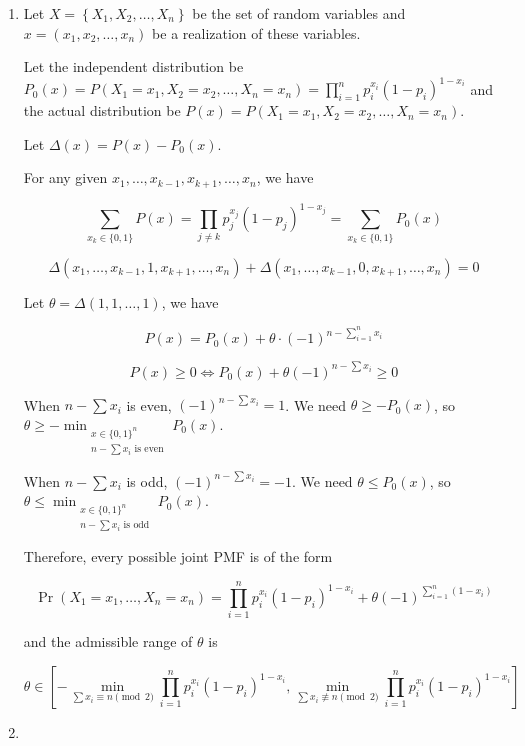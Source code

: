 \documentclass[a4paper]{article}
\begin{document}
\begin{enumerate}
    \item[(a)]
    
    Let $X = \left\{X_1, X_2, \dots, X_n\right\}$ be the set of random variables and $x = \left(x_1, x_2, \dots, x_n\right)$ be a realization of these variables.

    Let the independent distribution be $P_0(x) = P(X_1 = x_1, X_2 = x_2, \dots, X_n = x_n) = \prod_{i=1}^n p_i^{x_i}(1-p_i)^{1-x_i}$
    and the actual distribution be $P(x) = P(X_1 = x_1, X_2 = x_2, \dots, X_n = x_n)$.

    Let $\Delta(x) = P(x) - P_0(x)$.

    For any given $x_1, \dots, x_{k-1}, x_{k+1}, \dots, x_n$, we have

    $$
    \sum_{x_k \in \{0, 1\}} P(x) = \prod_{j \ne k} p_j^{x_j} (1 - p_j)^{1 - x_j} = \sum_{x_k \in \{0, 1\}} P_0(x)
    $$

    $$
    \Delta(x_1, \dots, x_{k-1}, 1, x_{k+1}, \dots, x_n) + \Delta(x_1, \dots, x_{k-1}, 0, x_{k+1}, \dots, x_n) = 0
    $$

    Let $\theta = \Delta(1, 1, \dots, 1)$, we have
    
    $$
    P(x) = P_0(x) + \theta \cdot (-1)^{n - \sum_{i=1}^n x_i}
    $$

    $$
    P(x) \ge 0 \iff P_0(x) + \theta (-1)^{n - \sum x_i} \ge 0
    $$

    When $n - \sum x_i$ is even, $(-1)^{n - \sum x_i} = 1$. We need $\theta \ge - P_0(x)$, so $\theta \ge - \min_{\substack{x \in \{0, 1\}^n \\ n - \sum x_i \text{ is even}}} P_0(x)$.

    When $n - \sum x_i$ is odd, $(-1)^{n - \sum x_i} = -1$. We need $\theta \le P_0(x)$, so $\theta \le \min_{\substack{x \in \{0, 1\}^n \\ n - \sum x_i \text{ is odd}}} P_0(x)$.

    Therefore, every possible joint PMF is of the form

    $$
    \Pr(X_1 = x_1, \dots, X_n = x_n) = \prod_{i=1}^n p_i^{x_i}(1-p_i)^{1-x_i} + \theta (-1)^{\sum_{i=1}^n (1-x_i)}
    $$

    and the admissible range of $\theta$ is

    $$
    \theta \in \left[- \min_{\sum x_i \equiv n \pmod 2} \prod_{i=1}^n p_i^{x_i}(1-p_i)^{1-x_i} , \min_{\sum x_i \not\equiv n \pmod 2} \prod_{i=1}^n p_i^{x_i}(1-p_i)^{1-x_i} \right]
    $$

    \item[(b)]
    

\end{enumerate}
\end{document}
